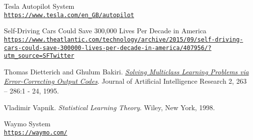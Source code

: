 \begin{thebibliography}{9}
	\hypertarget{TeslaAutopilotSystem}{} 
	Tesla Autopilot System
	\\\texttt{\url{https://www.tesla.com/en\_GB/autopilot}}
		
	\hypertarget{TheAtlantic}{} 
	Self-Driving Cars Could Save 300,000 Lives Per Decade in America
	\\\texttt{\url{https://www.theatlantic.com/technology/archive/2015/09/self-driving-cars-could-save-300000-lives-per-decade-in-america/407956/?utm\_source=SFTwitter}}
		
	\hypertarget{ThomasDietterichGhulumBakiri}{} 
	Thomas Dietterich and Ghulum Bakiri.
	\textit{\href{http://www.jair.org/media/105/live-105-1426-jair.pdf}{Solving Multiclass Learning Problems via Error-Correcting Output Codes}}.
	Journal of Artificial Intelligence Research 2, 263 – 286:1 - 24, 1995.
		
	\hypertarget{VladimirVapnik}{}  
	Vladimir Vapnik. 
	\textit{Statistical Learning Theory}. 
	Wiley, New York, 1998.
		
	\hypertarget{WaymoSystem}{} 
	Waymo System
	\\\texttt{\url{https://waymo.com/}}

\end{thebibliography}